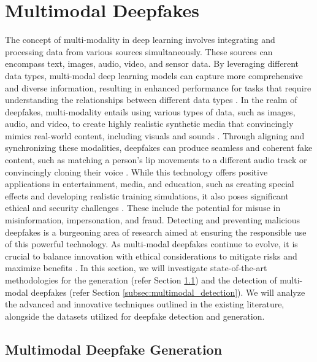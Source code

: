 \section{Multimodal Deepfakes}
\label{sec:multimodal_deepfakes_intro} 

The concept of multi-modality in deep learning involves integrating and processing data from various sources simultaneously. These sources can encompass text, images, audio, video, and sensor data. By leveraging different data types, multi-modal deep learning models can capture more comprehensive and diverse information, resulting in enhanced performance for tasks that require understanding the relationships between different data types \cite{gao2020survey, summaira2021recent, jabeen2023review}. In the realm of deepfakes, multi-modality entails using various types of data, such as images, audio, and video, to create highly realistic synthetic media that convincingly mimics real-world content, including visuals and sounds \cite{khalid2021fakeavceleb, hou2024polyglotfake}. Through aligning and synchronizing these modalities, deepfakes can produce seamless and coherent fake content, such as matching a person's lip movements to a different audio track or convincingly cloning their voice \cite{pei2024deepfake, prajwal2020lip, cheng2022videoretalking, lomnitz2020multimodal}. While this technology offers positive applications in entertainment, media, and education, such as creating special effects and developing realistic training simulations, it also poses significant ethical and security challenges \cite{pandey2021deepfakes}. These include the potential for misuse in misinformation, impersonation, and fraud. Detecting and preventing malicious deepfakes is a burgeoning area of research aimed at ensuring the responsible use of this powerful technology. As multi-modal deepfakes continue to evolve, it is crucial to balance innovation with ethical considerations to mitigate risks and maximize benefits \cite{khalid2021evaluation, liu2023magnifying, cheng2023voice}. In this section, we will investigate state-of-the-art methodologies for the generation (refer Section \ref{subsec:multimodal_generation}) and the detection of multi-modal deepfakes (refer Section \ref{subsec:multimodal_detection}). We will analyze the advanced and innovative techniques outlined in the existing literature, alongside the datasets utilized for deepfake detection and generation.

\subsection{Multimodal Deepfake Generation}
\label{subsec:multimodal_generation}

